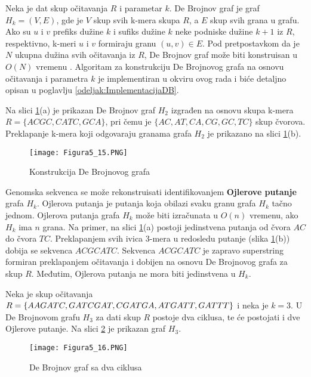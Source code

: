 \documentclass[12pt,oneside]{memoir}
\begin{document}
Neka je dat skup očitavanja $R$ i parametar $k$. De Brojnov graf je graf $H_k = (V, E)$, gde je $V$ skup svih k-mera skupa $R$, a $E$ skup svih grana u grafu. Ako su $u$ i $v$ prefiks dužine $k$ i sufiks dužine $k$ neke podniske dužine $k + 1$ iz $R$, respektivno, k-meri $u$ i $v$ formiraju granu $(u, v) \in E$. Pod pretpostavkom da je $N$ ukupna dužina svih očitavanja iz $R$, De Brojnov graf može biti konstruisan u $O(N)$ vremenu \cite{WingKinSung}. Algoritam za konstrukciju De Brojnovog grafa na osnovu očitavanja i parametra $k$ je implementiran u okviru ovog rada i biće detaljno opisan u poglavlju \ref{odeljak:ImplementacijaDB}.

Na slici \ref{fig:9}(a) je prikazan De Brojnov graf $H_2$ izgrađen na osnovu skupa k-mera $R = \{ACGC, CATC, GCA\}$, pri čemu je $\{AC, AT, CA, CG, GC, TC\}$ skup čvorova. Preklapanje k-mera koji odgovaraju granama grafa $H_2$ je prikazano na slici \ref{fig:9}(b).

\begin{figure}[!ht]
\centering
\texttt{[image: Figura5\_15.PNG]}
\caption{Konstrukcija De Brojnovog grafa \cite{WingKinSung}}
 \label{fig:9}
 \end{figure}

Genomska sekvenca se može rekonstruisati identifikovanjem \textbf{Ojlerove putanje} grafa $H_k$. Ojlerova putanja je putanja koja obilazi svaku granu grafa $H_k$ tačno jednom. Ojlerova putanja grafa $H_k$ može biti izračunata u $O(n)$ vremenu, ako $H_k$ ima $n$ grana. Na primer, na slici \ref{fig:9}(a) postoji jedinstvena putanja od čvora $AC$ do čvora $TC$. Preklapanjem svih ivica 3-mera u redosledu putanje (slika \ref{fig:9}(b)) dobija se sekvenca $ACGCATC$. Sekvenca $ACGCATC$ je zapravo superstring formiran preklapanjem očitavanja i dobijen na osnovu De Brojnovog grafa za skup $R$. Međutim, Ojlerova putanja ne mora biti jedinstvena u $H_k$.

Neka je skup očitavanja $R = \{AAGATC, GATCGAT, CGATGA, ATGATT,\\ GATTT\}$ i neka je $k = 3$. U De Brojnovom grafu $H_3$ za dati skup $R$ postoje dva ciklusa, te će postojati i dve Ojlerove putanje. Na slici \ref{fig:10} je prikazan graf $H_3$.

\begin{figure}[!ht]
\centering
\texttt{[image: Figura5\_16.PNG]}
\caption{De Brojnov graf sa dva ciklusa \cite{WingKinSung}}
\label{fig:10}
\end{figure}
\end{document}
